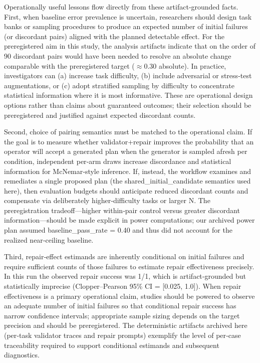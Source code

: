 \documentclass[conference]{IEEEtran}
\begin{document}
Operationally useful lessons flow directly from these artifact‑grounded facts. First, when baseline error prevalence is uncertain, researchers should design task banks or sampling procedures to produce an expected number of initial failures (or discordant pairs) aligned with the planned detectable effect. For the preregistered aim in this study, the analysis artifacts indicate that on the order of 90 discordant pairs would have been needed to resolve an absolute change comparable with the preregistered target (\ensuremath{\approx}0.30 absolute). In practice, investigators can (a) increase task difficulty, (b) include adversarial or stress‑test augmentations, or (c) adopt stratified sampling by difficulty to concentrate statistical information where it is most informative. These are operational design options rather than claims about guaranteed outcomes; their selection should be preregistered and justified against expected discordant counts.

Second, choice of pairing semantics must be matched to the operational claim. If the goal is to measure whether validator+repair improves the probability that an operator will accept a generated plan when the generator is sampled afresh per condition, independent per‑arm draws increase discordance and statistical information for McNemar‑style inference. If, instead, the workflow examines and remediates a single proposed plan (the shared\_initial\_candidate semantics used here), then evaluation budgets should anticipate reduced discordant counts and compensate via deliberately higher‑difficulty tasks or larger N. The preregistration tradeoff---higher within‑pair control versus greater discordant information---should be made explicit in power computations; our archived power plan assumed baseline\_pass\_rate = 0.40 and thus did not account for the realized near‑ceiling baseline.

Third, repair‑effect estimands are inherently conditional on initial failures and require sufficient counts of those failures to estimate repair effectiveness precisely. In this run the observed repair success was 1/1, which is artifact‑grounded but statistically imprecise (Clopper--Pearson 95\% CI = [0.025, 1.0]). When repair effectiveness is a primary operational claim, studies should be powered to observe an adequate number of initial failures so that conditional repair success has narrow confidence intervals; appropriate sample sizing depends on the target precision and should be preregistered. The deterministic artifacts archived here (per‑task validator traces and repair prompts) exemplify the level of per‑case traceability required to support conditional estimands and subsequent diagnostics.
\end{document}
